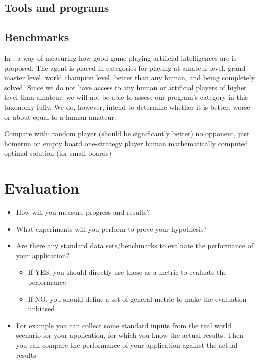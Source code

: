 \documentclass[times, 10pt,twocolumn]{article}
\begin{document}
\subsection{Tools and programs}

\subsection{Benchmarks}

In \cite{games_solved}, a way of measuring how good game playing artificial intelligences are is proposed. The agent is placed in categories for playing at amateur level, grand master level, world champion level, better than any human, and being completely solved. Since we do not have access to any human or artificial players of higher level than amateur, we will not be able to assess our program's category in this taxonomy fully. We do, however, intend to determine whether it is better, worse or about equal to a human amateur.

Compare with:
random player (should be significantly better)
no opponent, just homerun on empty board
one-strategy player
human
mathematically computed optimal solution (for small boards)

\section{Evaluation}

\begin{itemize}
	\item{How will you measure progress and results?}
	\item{What experiments will you perform to prove your hypothesis?}
	\item{Are there any standard data sets/benchmarks to evaluate the performance of your application?}
	\begin{itemize}
		\item{If YES, you should directly use those as a metric to evaluate the performance}
		\item{If NO, you should define a set of general metric to make the evaluation unbiased}
	\end{itemize}
	\item{For example you can collect some standard inputs from the real world scenario for your application, for which you know the actual results. Then you can compare the performance of your application against the actual results}
\end{itemize}
\end{document}
